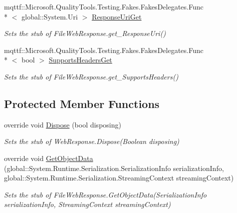 \begin{DoxyCompactItemize}
mqttf\-::\-Microsoft.\-Quality\-Tools.\-Testing.\-Fakes.\-Fakes\-Delegates.\-Func\\*
$<$ global\-::\-System.\-Uri $>$ \hyperlink{class_system_1_1_net_1_1_fakes_1_1_stub_file_web_response_ab6b57438f07e3b478e294f1c105b4cb7}{Response\-Uri\-Get}
\begin{DoxyCompactList}\small\item\em Sets the stub of File\-Web\-Response.\-get\-\_\-\-Response\-Uri()\end{DoxyCompactList}\item 
mqttf\-::\-Microsoft.\-Quality\-Tools.\-Testing.\-Fakes.\-Fakes\-Delegates.\-Func\\*
$<$ bool $>$ \hyperlink{class_system_1_1_net_1_1_fakes_1_1_stub_file_web_response_a5d319bf6a8c6808b2e3b1f0999168a7d}{Supports\-Headers\-Get}
\begin{DoxyCompactList}\small\item\em Sets the stub of File\-Web\-Response.\-get\-\_\-\-Supports\-Headers()\end{DoxyCompactList}\end{DoxyCompactItemize}
\subsection*{Protected Member Functions}
\begin{DoxyCompactItemize}
\item 
override void \hyperlink{class_system_1_1_net_1_1_fakes_1_1_stub_file_web_response_a814d45941e995f6b97a34b260901ab88}{Dispose} (bool disposing)
\begin{DoxyCompactList}\small\item\em Sets the stub of Web\-Response.\-Dispose(\-Boolean disposing)\end{DoxyCompactList}\item 
override void \hyperlink{class_system_1_1_net_1_1_fakes_1_1_stub_file_web_response_ad213a908bc0acaaf819031c48cbc0918}{Get\-Object\-Data} (global\-::\-System.\-Runtime.\-Serialization.\-Serialization\-Info serialization\-Info, global\-::\-System.\-Runtime.\-Serialization.\-Streaming\-Context streaming\-Context)
\begin{DoxyCompactList}\small\item\em Sets the stub of File\-Web\-Response.\-Get\-Object\-Data(\-Serialization\-Info serialization\-Info, Streaming\-Context streaming\-Context)\end{DoxyCompactList}\end{DoxyCompactItemize}
